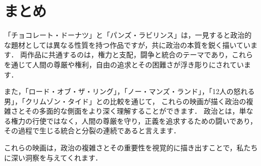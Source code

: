 \documentclass[titlepage,a4paper]{jsarticle}
\begin{document}
\section{まとめ}
「チョコレート・ドーナツ」と「パンズ・ラビリンス」は，一見すると政治的な題材としては異なる性質を持つ作品ですが，共に政治の本質を鋭く描いています．
両作品に共通するのは，権力と支配，闘争と統合のテーマであり，これらを通じて人間の尊厳や権利，自由の追求とその困難さが浮き彫りにされています．

また，「ロード・オブ・ザ・リング」，「ノー・マンズ・ランド」，「12人の怒れる男」，「クリムゾン・タイド」との比較を通じて，
これらの映画が描く政治の複雑さとその多面的な側面をより深く理解することができます．
政治とは，単なる権力の行使ではなく，人間の尊厳を守り，正義を追求するための闘いであり，その過程で生じる統合と分裂の連続であると言えます．

これらの映画は，政治の複雑さとその重要性を視覚的に描き出すことで，私たちに深い洞察を与えてくれます．
\end{document}
